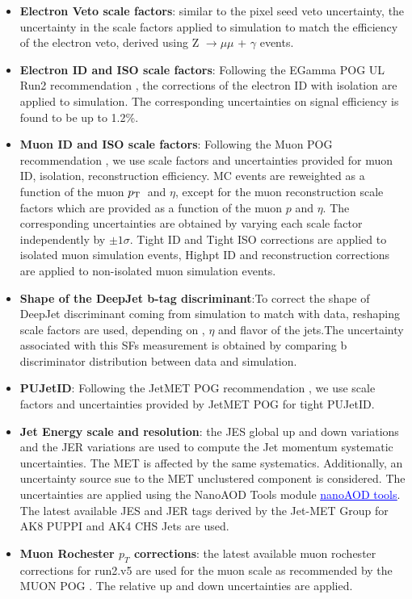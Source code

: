 \begin{itemize}
	\item \textbf{Electron Veto scale factors}: similar to the pixel seed veto uncertainty, the uncertainty in the scale factors applied to simulation to match the efficiency of the electron veto, derived using Z $\to \mu\mu$ + $\gamma$ events.
	\item \textbf{Electron ID and ISO scale factors}: Following the EGamma POG UL Run2 recommendation \cite{CMS:electron}, the corrections of the electron ID with isolation are applied to simulation. The corresponding uncertainties on signal efficiency is found to be up to 1.2\%.
  \item \textbf{Muon ID and ISO scale factors}: Following the Muon POG recommendation \cite{CMS:muon}, we use scale factors and uncertainties provided for muon ID, isolation, reconstruction efficiency. MC events are reweighted as a function of the muon $p_\mathrm{T}\hspace{0.2em}$ and $\eta$, except for the muon reconstruction scale factors which are provided as a function of the muon $p$ and $\eta$. The corresponding uncertainties are obtained by varying each scale factor independently by $\pm 1 \sigma$. Tight ID and Tight ISO corrections are applied to isolated muon simulation events, Highpt ID and reconstruction corrections are applied to non-isolated muon simulation events. %
  \item \textbf{Shape of the DeepJet b-tag discriminant}:To correct the shape of DeepJet discriminant coming from simulation to match with data, reshaping scale factors are used, depending on \pt, $\eta$ and flavor of the jets.The uncertainty associated with this SFs measurement is obtained by comparing b discriminator distribution between data and simulation.
  \item \textbf{PUJetID}: Following the JetMET POG recommendation \cite{pileupid}, we use scale factors and uncertainties provided by JetMET POG \cite{JMEjsonpog}for tight PUJetID.

  \item \textbf{Jet Energy scale and resolution}: the JES global up and down variations and the JER variations are used to compute the Jet
  momentum systematic uncertainties. The MET is affected by the same systematics. Additionally, an uncertainty source sue to the MET
  unclustered component is considered. The uncertainties are applied using the NanoAOD Tools module \href{https://github.com/shaoweisong/NanoAODTools/blob/HHWWgg/python/postprocessing/modules/jme/jetmetHelperRun2.py}{\textcolor{blue}{\underline{nanoAOD tools}}}. The latest available JES and JER tags derived by the Jet-MET Group \cite{CMS:JER} for AK8 PUPPI and AK4 CHS Jets are used.%
  \item \textbf{Muon Rochester \( p_T \) corrections}: the latest available muon rochester corrections for run2.v5 are used for the muon scale as recommended by the MUON POG \cite{CMS:muonrocch}. The relative up and down uncertainties are applied. %


\end{itemize}
